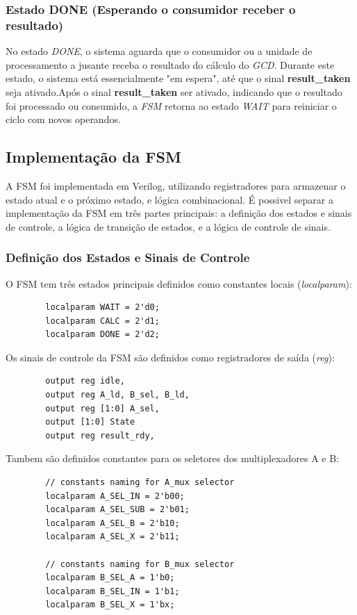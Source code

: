 \documentclass[a4paper,11pt]{article} %
\begin{document}
\subsubsection{Estado DONE (Esperando o consumidor receber o resultado)}
No estado \textit{DONE}, o sistema aguarda que o consumidor ou a
unidade de processamento a jusante receba o resultado do
cálculo do \textit{GCD}. Durante este estado, o sistema está
essencialmente "em espera", até que o sinal \textbf{result\_taken}
seja ativado.Após o sinal \textbf{result\_taken} ser ativado,
indicando que o resultado foi processado ou consumido,
a \textit{FSM} retorna ao estado \textit{WAIT} para reiniciar o ciclo
com novos operandos.


\subsection{Implementação da FSM}

A FSM foi implementada em Verilog, utilizando registradores
para armazenar o estado atual e o próximo estado, e lógica
combinacional. É possivel separar a implementação da FSM em
três partes principais: a definição dos estados e sinais de
controle, a lógica de transição de estados, e a lógica de
controle de sinais.

\subsubsection{Definição dos Estados e Sinais de Controle}
O FSM tem três estados principais definidos como constantes locais (\textit{localparam}):

\begin{verbatim}
        localparam WAIT = 2'd0;
        localparam CALC = 2'd1;
        localparam DONE = 2'd2;
\end{verbatim}

Os sinais de controle da FSM são definidos como registradores de saída (\textit{reg}):
\begin{verbatim}
        output reg idle,
        output reg A_ld, B_sel, B_ld,
        output reg [1:0] A_sel,
        output [1:0] State
        output reg result_rdy,
\end{verbatim}

Tambem são definidos constantes para os seletores dos multiplexadores A e B:
\begin{verbatim}
        // constants naming for A_mux selector
        localparam A_SEL_IN = 2'b00;
        localparam A_SEL_SUB = 2'b01;
        localparam A_SEL_B = 2'b10;
        localparam A_SEL_X = 2'b11;

        // constants naming for B_mux selector
        localparam B_SEL_A = 1'b0;
        localparam B_SEL_IN = 1'b1;
        localparam B_SEL_X = 1'bx;
\end{verbatim}
\end{document}
